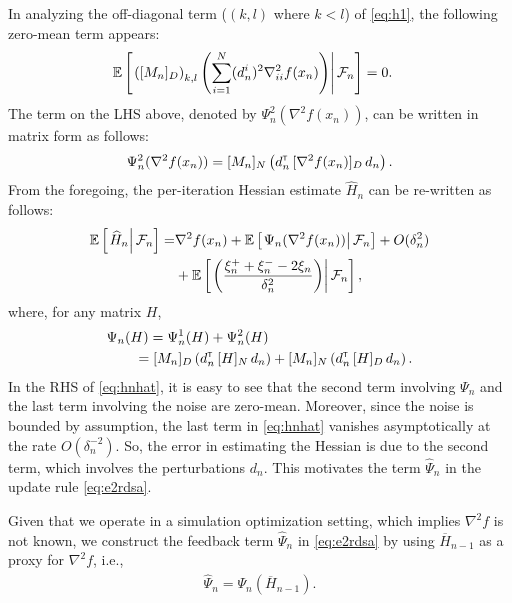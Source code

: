 \documentclass[letterpaper, 10 pt, conference]{ieeeconf}  %
\begin{document}
In analyzing the off-diagonal term ($(k,l)$ where $k < l$) of \eqref{eq:h1}, the following zero-mean term appears:
\begin{align}
& \mathbb{E}\left[\left.\left([M_n]_{D}\right)_{k,l}   \left(\sum\limits_{i=1}^N (d_n^i)^2 \nabla^2_{ii} f(x_n)\right)\right| \mathcal{F}_n \right] = 0. 
\end{align}
The term on the LHS above, denoted by $\Psi_{n}^{2}(\nabla^2 f(x_n))$, can be written in matrix form as follows: 
\begin{align}\label{eq:ndmat}
\Psi_{n}^{2}(\nabla^2 f(x_n)) = [M_n]_{N}\left(d_{n}^\mathsf{\scriptscriptstyle T} \, [\nabla^2 f(x_n)]_{D} \, d_{n}\right).
\end{align}
From the foregoing, the per-iteration Hessian estimate $\widehat H_n$ can be re-written as follows:
\begin{align}
 \mathbb{E}\left[\left.\widehat H_n\right| \mathcal{F}_n\right] = & \nabla^2 f(x_n) + \mathbb{E}\left[\left.\Psi_{n}(\nabla^2 f(x_n))\right| \mathcal{F}_n\right]  +  O(\delta_n^2)\nonumber\\
&+\mathbb{E}\left[\left.\left(\dfrac{\xi_n^+ + \xi_n^- - 2 \xi_n}{\delta_n^2} \right)\right| \mathcal{F}_n\right], \label{eq:hnhat}
\end{align}
where, for any matrix $H$, 
\begin{align}
&\Psi_{n}(H) = \Psi_{n}^{1}(H) + \Psi_{n}^{2}(H)\nonumber\\
&\qquad= [M_n]_{D}\left(d_{n}^\mathsf{\scriptscriptstyle T} \, [H]_{N} \, d_{n}\right) +  [M_n]_{N}\left(d_{n}^\mathsf{\scriptscriptstyle T} \, [H]_{D} \, d_{n}\right).\label{eq:psi}
\end{align}
In the RHS of \eqref{eq:hnhat}, it is easy to see that  the second term involving $\Psi_{n}$ and the last term involving the noise are zero-mean. Moreover, since the noise is bounded by assumption, the last term in \eqref{eq:hnhat} vanishes asymptotically at the rate $O(\delta_n^{-2})$. So, the error in estimating the Hessian is due to the second term, which involves the perturbations $d_n$. This motivates the term $\widehat \Psi_n$ in the update rule \eqref{eq:e2rdsa}. 


Given that we operate in a simulation optimization setting, which implies $\nabla^2 f$ is not known, we construct the feedback term $\widehat \Psi_n$ in \eqref{eq:e2rdsa} by using $\overline H_{n-1}$ as a proxy for $\nabla^2 f$, i.e.,
\begin{align}
\widehat \Psi_n = \Psi_{n} (\overline H_{n-1}).
\end{align}
\end{document}
